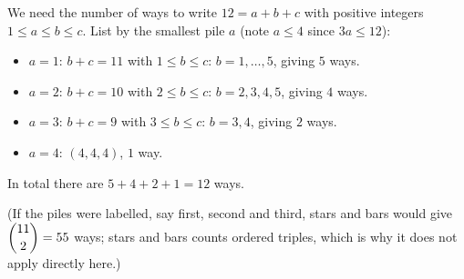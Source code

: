 We need the number of ways to write $12=a+b+c$ with positive integers $1\le a\le b\le c$. List by the smallest pile $a$ (note $a\le4$ since $3a\le12$):
\begin{itemize}
\item $a=1$: $b+c=11$ with $1\le b\le c$: $b=1,\dots,5$, giving $5$ ways.
\item $a=2$: $b+c=10$ with $2\le b\le c$: $b=2,3,4,5$, giving $4$ ways.
\item $a=3$: $b+c=9$ with $3\le b\le c$: $b=3,4$, giving $2$ ways.
\item $a=4$: $(4,4,4)$, $1$ way.
\end{itemize}
In total there are $5+4+2+1=\boxed{12}$ ways.

(If the piles were labelled, say first, second and third, stars and bars would give $\dbinom{11}{2}=55$ ways; stars and bars counts ordered triples, which is why it does not apply directly here.)
